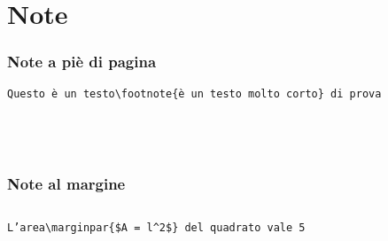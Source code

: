\section{Note}
\begin{frame}[fragile]\transfade\centering
  \frametitle{Note a piè di pagina}
  \verb!Questo è un testo\footnote{è un testo molto corto} di prova!\\~\\
  ~\\~
\end{frame}
\begin{frame}\transfade\centering
  \frametitle{Note al margine}
  \begin{columns}
      \texttt{L'area\textbackslash marginpar\{\$A = l\^{}2\$\} del quadrato vale 5}\\~\\
      ~\\~
  \end{columns}
\end{frame}
